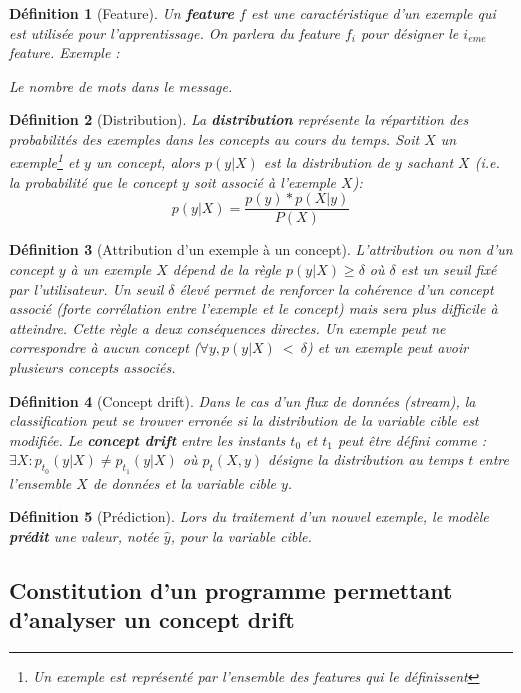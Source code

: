 \documentclass[utf8]{stageM2R} %
\newtheorem{mydef}{Définition}
\theoremstyle{remark}
\renewcommand{\emph}{\textbf}
\newenvironment{exemple}{%
\upshape Exemple :%
    \small     %
}{%
}
\begin{document}
\begin{mydef}[Feature]
Un \emph{feature} $f$ est une caractéristique d'un exemple qui est utilisée pour l'apprentissage. On parlera du feature $f_i$ pour désigner le $i_{eme}$ feature.
\begin{exemple}
Le nombre de mots dans le message.
\end{exemple}
\end{mydef}



\begin{mydef}[Distribution]
\label{defDistribution}
La \emph{distribution} représente la répartition des probabilités des exemples dans les concepts au cours du temps. Soit $X$ un exemple\footnote{Un exemple est représenté par l'ensemble des features qui le définissent} et $y$ un concept, alors $p(y|X)$ est la distribution de $y$ sachant $X$ (i.e. la probabilité que le concept $y$ soit associé à l'exemple $X$):
\[
p(y|X) = \frac{p(y)*p(X|y)}{P(X)}
\]
\end{mydef}

\begin{mydef}[Attribution d'un exemple à un concept]
L'attribution ou non d'un concept $y$ à un exemple $X$ dépend de la règle $p(y|X) \geq \delta$ où $\delta$ est un seuil fixé par l'utilisateur. Un seuil $\delta$ élevé permet de renforcer la cohérence d'un concept associé (forte corrélation entre l'exemple et le concept) mais sera plus difficile à atteindre. Cette règle a deux conséquences directes. Un exemple peut ne correspondre à aucun concept ($\forall y, p(y|X)~<~\delta$) et un exemple peut avoir plusieurs concepts associés.
\end{mydef}

\begin{mydef}[Concept drift]
Dans le cas d'un flux de données (stream), la classification peut se trouver erronée si la distribution de la variable cible est modifiée. Le \emph{concept drift} entre les instants $t_0$ et $t_1$ peut être défini comme : $\exists X : p_{t_0}(y|X) \ne p_{t_1}(y|X)$ 
où $ p_{t}(X,y)$ désigne la distribution au temps $t$ entre l'ensemble $X$ de données et la variable cible $y$.
\end{mydef}

\begin{mydef}[Prédiction]
Lors du traitement d'un nouvel exemple, le modèle \emph{prédit} une valeur, notée $\widehat{y}$, pour la variable cible.
\end{mydef}

\subsection{Constitution d'un programme permettant d'analyser un concept drift}
\end{document}
